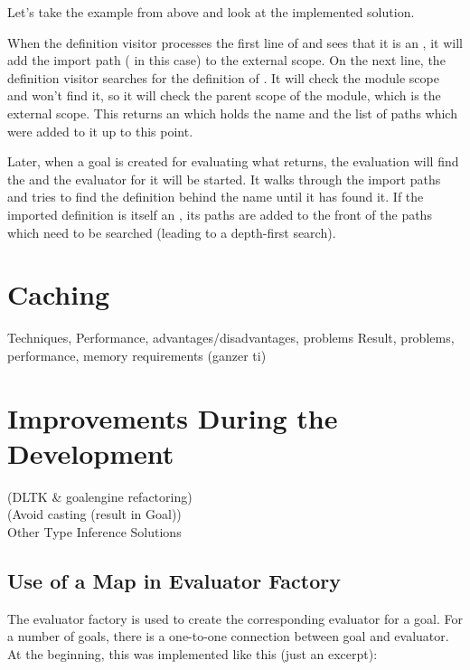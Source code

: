\documentclass[12pt,halfparskip,DIV11,BCOR10mm]{scrreprt}
\begin{document}
Let's take the example from above and look at the implemented solution.

When the definition visitor processes the first line of  and sees that it is an , it will add the import path ( in this case) to the external scope. On the next line, the definition visitor searches for the definition of . It will check the module scope and won't find it, so it will check the parent scope of the module, which is the external scope. This returns an  which holds the name and the list of  paths which were added to it up to this point.

Later, when a goal is created for evaluating what  returns, the evaluation will find the  and the evaluator for it will be started. It walks through the import paths and tries to find the definition behind the name  until it has found it. If the imported definition is itself an , its paths are added to the front of the paths which need to be searched (leading to a depth-first search).


\section{Caching}
 Techniques, Performance, advantages/disadvantages, problems
 Result, problems, performance, memory requirements (ganzer ti)


\section{Improvements During the Development}

 (DLTK \& goalengine refactoring) \\
 (Avoid casting (result in Goal))\\
Other Type Inference Solutions

\subsection{Use of a Map in Evaluator Factory}


The evaluator factory is used to create the corresponding evaluator for a goal. For a number of goals, there is a one-to-one connection between goal and evaluator. At the beginning, this was implemented like this (just an excerpt):
\end{document}
